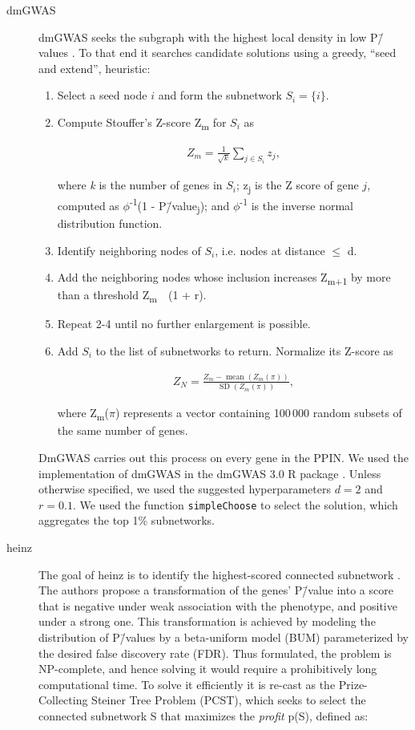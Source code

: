 \documentclass[10pt,letterpaper]{article}
\begin{document}
\begin{description}
\item[{dmGWAS}] dmGWAS seeks the subgraph with the highest local density in low P\=/values \cite{jia_dmgwas:_2011}. To that end it searches candidate solutions using a greedy, ``seed and extend'', heuristic:

\begin{enumerate}
\item Select a seed node $i$ and form the subnetwork $S_i=\{i\}$.
\item Compute Stouffer's Z-score Z\textsubscript{m} for $S_i$ as

\begin{eqnarray} 
Z_m = \frac{1}{\sqrt{k}} \sum_{j \in S_i} z_j,
\end{eqnarray}

where \emph{k} is the number of genes in $S_i$; z\textsubscript{j} is the Z score of gene $j$, computed as \(\phi\)\textsuperscript{-1}(1 - P\=/value\textsubscript{j}); and \(\phi\)\textsuperscript{-1} is the inverse normal distribution function.
\item Identify neighboring nodes of $S_i$,  i.e. nodes at distance \(\le\) d.
\item Add the neighboring nodes whose inclusion increases Z\textsubscript{m+1} by more than a threshold Z\textsubscript{m}~\texttimes{}~(1 + r).
\item Repeat 2-4 until no further enlargement is possible.
\item Add $S_i$ to the list of subnetworks to return. Normalize its Z-score as

\begin{eqnarray}
Z_{N}=\frac{Z_{m}-\operatorname{mean}\left(Z_{m}(\pi)\right)}{\operatorname{SD}\left(Z_{m}(\pi)\right)},
\end{eqnarray} 

where Z\textsubscript{m}(\(\pi\)) represents a vector containing 100\,000 random subsets of the same number of genes.
\end{enumerate}

DmGWAS carries out this process on every gene in the PPIN. We used the implementation of dmGWAS in the dmGWAS 3.0 R package \cite{dmgwas}. Unless otherwise specified, we used the suggested hyperparameters $d = 2$ and $r = 0.1$. We used the function \texttt{simpleChoose} to select the solution, which aggregates the top 1\% subnetworks.

\item[{heinz}] The goal of heinz is to identify the highest-scored connected subnetwork \cite{dittrich_identifying_2008}. The authors propose a transformation of the genes' P\=/value into a score that is negative under weak association with the phenotype, and positive under a strong one. This transformation is achieved by modeling the distribution of P\=/values by a beta-uniform model (BUM) parameterized by the desired false discovery rate (FDR). Thus formulated, the problem is NP-complete, and hence solving it would require a prohibitively long computational time. To solve it efficiently it is re-cast as the Prize-Collecting Steiner Tree Problem (PCST), which seeks to select the connected subnetwork S that maximizes the \emph{profit} p(S), defined as:


\end{description}
\end{document}

